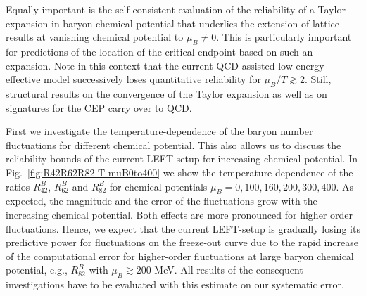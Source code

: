 \documentclass[%
reprint,
superscriptaddress,
showpacs,preprintnumbers,
amsmath,amssymb,
aps,
prd,
]{revtex4-1}
\def\Fig#1{Fig.~\ref{#1}} \def\Tab#1{Tab.~\ref{#1}}
\begin{document}
Equally important is the self-consistent evaluation of the reliability of a Taylor expansion in baryon-chemical potential that underlies the extension of lattice results at vanishing chemical potential to $\mu_B\neq 0$. This is particularly important for predictions of the location of the critical endpoint based on such an expansion. Note in this context that the current QCD-assisted low energy effective model successively loses quantitative reliability for $\mu_B/T\gtrsim 2$. Still,  structural results on the convergence of the Taylor expansion as well as on signatures for the CEP carry over to QCD. 

First we investigate the temperature-dependence of the baryon number fluctuations for different chemical potential. This also allows us to discuss the reliability bounds of the current LEFT-setup for increasing chemical potential. In \Fig{fig:R42R62R82-T-muB0to400} we show the temperature-dependence of the ratios $R^{B}_{42}$, $R^{B}_{62}$ and $R^{B}_{82}$ for chemical potentials $\mu_B=0, 100, 160, 200, 300, 400$. As expected, the magnitude and the error of the fluctuations grow with the increasing chemical potential. Both effects are more pronounced for higher order fluctuations. Hence, we expect that the current LEFT-setup is gradually losing its predictive power for fluctuations on the freeze-out curve 
due  to the rapid increase of the computational error for higher-order fluctuations at large baryon chemical potential, e.g., $R^{B}_{82}$ with $\mu_B\gtrsim 200$ MeV. All results of the consequent investigations have to be evaluated with this estimate on our systematic error.  
\end{document}
